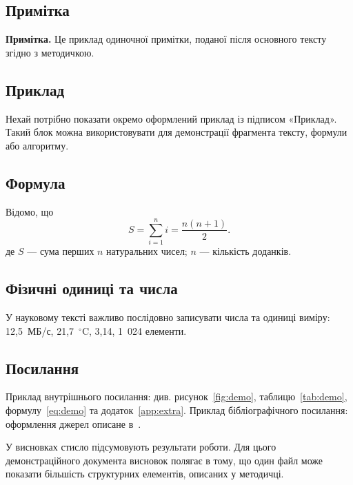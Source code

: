 ﻿\documentclass[14pt]{extarticle}
\begin{document}
\subsection{Примітка}
\vspace{2\baselineskip}
{\singlespacing\fontsize{12pt}{14pt}\selectfont\noindent\textbf{Примітка.} Це приклад одиночної примітки, поданої після основного тексту згідно з методичкою.\par}
\vspace{2\baselineskip}

\subsection{Приклад}
\begin{KNUExample}
Нехай потрібно показати окремо оформлений приклад із підписом «Приклад». Такий блок можна використовувати для демонстрації фрагмента тексту, формули або алгоритму.
\end{KNUExample}

\subsection{Формула}
Відомо, що
\begin{equation}
  \label{eq:demo}
  S = \sum_{i=1}^{n} i = \frac{n(n+1)}{2}.
\end{equation}
\noindent де $S$ --- сума перших $n$ натуральних чисел; $n$ --- кількість доданків.

\subsection{Фізичні одиниці та числа}
У науковому тексті важливо послідовно записувати числа та одиниці виміру: 12{,}5~МБ/с, 21{,}7~$^{\circ}$C, 3{,}14, 1~024 елементи.

\subsection{Посилання}
Приклад внутрішнього посилання: див. рисунок~\ref{fig:demo}, таблицю~\ref{tab:demo}, формулу~\eqref{eq:demo} та додаток~\ref{app:extra}. Приклад бібліографічного посилання: оформлення джерел описане в~\cite{dstu-style}.

У висновках стисло підсумовують результати роботи. Для цього демонстраційного документа висновок полягає в тому, що один файл може показати більшість структурних елементів, описаних у методичці.
\end{document}
